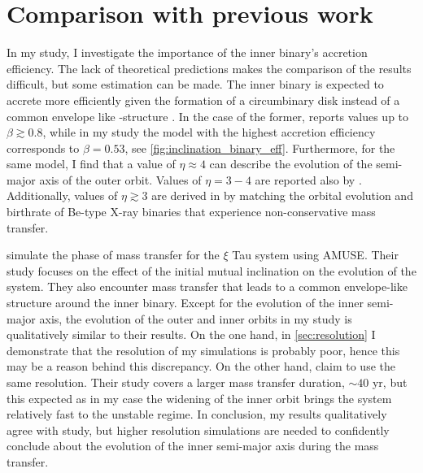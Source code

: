 \section{Comparison with previous work}

In my study, I investigate the importance of the inner binary's accretion efficiency. The lack of theoretical predictions makes the comparison of the results difficult, but some estimation can be made. The inner binary is expected to accrete more efficiently given the formation of a circumbinary disk instead of a common envelope like -structure \citep{zwart2019triple}. In the case of the former, \cite{zwart2019triple} reports values up to $\beta \gtrsim 0.8$, while in my study the model with the highest accretion efficiency corresponds to $\beta = 0.53$, see \cref{fig:inclination_binary_eff}. Furthermore, for the same model, I find that a value of $\eta \approx 4$ can describe the evolution of the semi-major axis of the outer orbit. Values of $\eta = 3-4$ are reported also by \cite{de2014evolution, zwart2019triple}. Additionally, values of $\eta \gtrsim 3$ are derived in \cite{portegies1995formation} by matching the orbital evolution and birthrate of Be-type X-ray binaries that experience non-conservative mass transfer.

\cite{de2014evolution} simulate the phase of mass transfer for the $\xi$ Tau system using AMUSE. Their study focuses on the effect of the initial mutual inclination on the evolution of the system. They also encounter mass transfer that leads to a common envelope-like structure around the inner binary. Except for the evolution of the inner semi-major axis, the evolution of the outer and inner orbits in my study is qualitatively similar to their results. On the one hand, in \cref{sec:resolution} I demonstrate that the resolution of my simulations is probably poor, hence this may be a reason behind this discrepancy. On the other hand, \cite{de2014evolution} claim to use the same resolution. Their study covers a larger mass transfer duration, $\sim 40$ yr, but this expected as in my case the widening of the inner orbit brings the system relatively fast to the unstable regime. In conclusion, my results qualitatively agree with \cite{de2014evolution} study, but higher resolution simulations are needed to confidently conclude about the evolution of the inner semi-major axis during the mass transfer.

